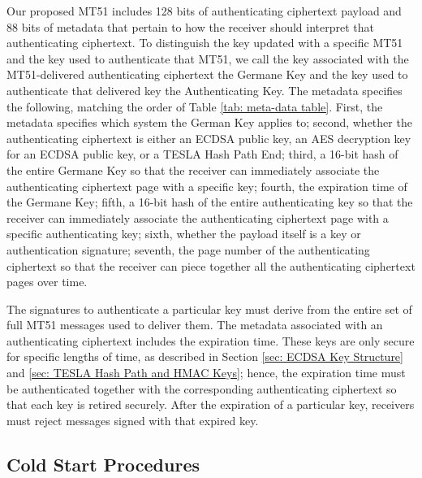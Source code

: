 \documentclass[letterpaper,times]{IONconf/IONconf}
\begin{document}
Our proposed MT51 includes 128 bits of authenticating ciphertext payload and 88 bits of metadata that pertain to how the receiver should interpret that authenticating ciphertext.
To distinguish the key updated with a specific MT51 and the key used to authenticate that MT51, we call the key associated with the MT51-delivered authenticating ciphertext the Germane Key and the key used to authenticate that delivered key the Authenticating Key.
The metadata specifies the following, matching the order of Table \ref{tab: meta-data table}.
First, the metadata specifies which system the German Key applies to;
second, whether the authenticating ciphertext is either an ECDSA public key, an AES decryption key for an ECDSA public key, or a TESLA Hash Path End;
third, a 16-bit hash of the entire Germane Key so that the receiver can immediately associate the authenticating ciphertext page with a specific key;
fourth, the expiration time of the Germane Key;
fifth, a 16-bit hash of the entire authenticating key so that the receiver can immediately associate the authenticating ciphertext page with a specific authenticating key;
sixth, whether the payload itself is a key or authentication signature;
seventh, the page number of the authenticating ciphertext so that the receiver can piece together all the authenticating ciphertext pages over time.

The signatures to authenticate a particular key must derive from the entire set of full MT51 messages used to deliver them.
The metadata associated with an authenticating ciphertext includes the expiration time.
These keys are only secure for specific lengths of time, as described in Section \ref{sec: ECDSA Key Structure} and \ref{sec: TESLA Hash Path and HMAC Keys}; hence, the expiration time must be authenticated together with the corresponding authenticating ciphertext so that each key is retired securely.
After the expiration of a particular key, receivers must reject messages signed with that expired key.

\subsection{Cold Start Procedures}
\end{document}
